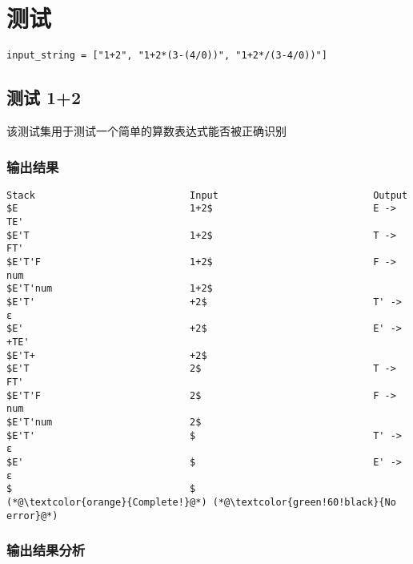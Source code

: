 \documentclass[lang=cn,11pt,a4paper]{elegantpaper}
\begin{document}
\section{测试}

\lstinline{input_string = ["1+2", "1+2*(3-(4/0))", "1+2*/(3-4/0))"]}


\subsection{测试 1+2}
该测试集用于测试一个简单的算数表达式能否被正确识别

\subsubsection{输出结果}

\begin{lstlisting}[language=text]
Stack                          	Input                          	Output
$E                             	1+2$                          	E -> TE'
$E'T                           	1+2$                          	T -> FT'
$E'T'F                         	1+2$                          	F -> num
$E'T'num                       	1+2$                          	
$E'T'                          	+2$                           	T' -> ε
$E'                            	+2$                           	E' -> +TE'
$E'T+                          	+2$                           	
$E'T                           	2$                            	T -> FT'
$E'T'F                         	2$                            	F -> num
$E'T'num                       	2$                            	
$E'T'                          	$                             	T' -> ε
$E'                            	$                             	E' -> ε
$                              	$                             	
(*@\textcolor{orange}{Complete!}@*)	(*@\textcolor{green!60!black}{No error}@*)
\end{lstlisting}


\subsubsection{输出结果分析}
\end{document}
